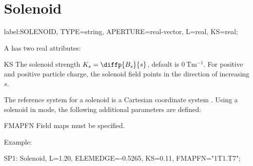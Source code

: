 \clearpage
\section{Solenoid}
\label{sec:solenoid}
\begin{example}
label:SOLENOID, TYPE=string, APERTURE=real-vector,
      L=real, KS=real;
\end{example}
A  has two real attributes:
\begin{kdescription}
\item[KS]
  The solenoid strength $K_s=\diffp{B_s}{s}$, default is $\SI{0}{\tesla\meter\tothe{-1}}$.
  For positive  and positive particle charge,
  the solenoid field points in the direction of increasing $s$.
\end{kdescription}
The reference system for a solenoid is a Cartesian coordinate system
. Using a solenoid in \opalt mode, the following additional parameters are defined:
\begin{kdescription}
\item[FMAPFN]
  Field maps must be specified.
\end{kdescription}
\noindent Example:
\begin{example}
SP1: Solenoid, L=1.20, ELEMEDGE=-0.5265, KS=0.11,
     FMAPFN="1T1.T7";
\end{example}

\clearpage
